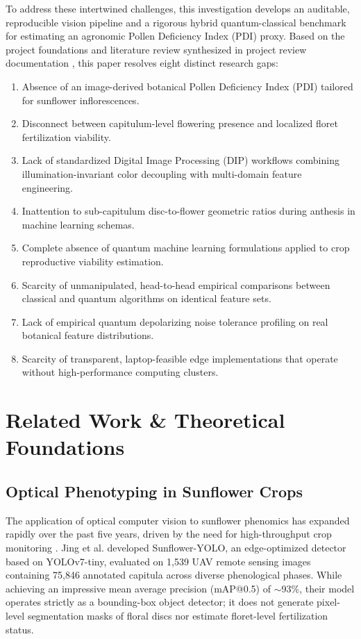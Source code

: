\documentclass{ieeeaccess}
\begin{document}
To address these intertwined challenges, this investigation develops an auditable, reproducible vision pipeline and a rigorous hybrid quantum-classical benchmark for estimating an agronomic Pollen Deficiency Index (PDI) proxy. Based on the project foundations and literature review synthesized in project review documentation \cite{bose2026progress}, this paper resolves eight distinct research gaps:
\begin{enumerate}
    \item Absence of an image-derived botanical Pollen Deficiency Index (PDI) tailored for sunflower inflorescences.
    \item Disconnect between capitulum-level flowering presence and localized floret fertilization viability.
    \item Lack of standardized Digital Image Processing (DIP) workflows combining illumination-invariant color decoupling with multi-domain feature engineering.
    \item Inattention to sub-capitulum disc-to-flower geometric ratios during anthesis in machine learning schemas.
    \item Complete absence of quantum machine learning formulations applied to crop reproductive viability estimation.
    \item Scarcity of unmanipulated, head-to-head empirical comparisons between classical and quantum algorithms on identical feature sets.
    \item Lack of empirical quantum depolarizing noise tolerance profiling on real botanical feature distributions.
    \item Scarcity of transparent, laptop-feasible edge implementations that operate without high-performance computing clusters.
\end{enumerate}

\section{Related Work \& Theoretical Foundations}
\label{sec:related_work}

\subsection{Optical Phenotyping in Sunflower Crops}
The application of optical computer vision to sunflower phenomics has expanded rapidly over the past five years, driven by the need for high-throughput crop monitoring \cite{jing2024sunflower}. Jing et al. \cite{jing2024sunflower} developed Sunflower-YOLO, an edge-optimized detector based on YOLOv7-tiny, evaluated on 1,539 UAV remote sensing images containing 75,846 annotated capitula across diverse phenological phases. While achieving an impressive mean average precision (mAP@0.5) of $\sim$93\%, their model operates strictly as a bounding-box object detector; it does not generate pixel-level segmentation masks of floral discs nor estimate floret-level fertilization status.
\end{document}
